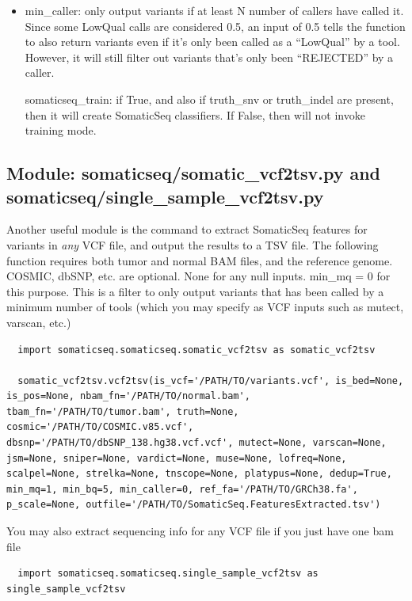 \documentclass[10pt,letterpaper]{article}
\begin{document}
\begin{sloppypar}
\begin{itemize}
\item min\_caller: only output variants if at least N number of callers have called it. Since some LowQual calls are considered 0.5, an input of 0.5 tells the function to also return variants even if it's only been called as a ``LowQual'' by a tool. However, it will still filter out variants that's only been ``REJECTED'' by a caller.

somaticseq\_train: if True, and also if truth\_snv or truth\_indel are present, then it will create SomaticSeq classifiers. If False, then will not invoke training mode. 

\end{itemize}





\subsection{Module: somaticseq/somatic\_vcf2tsv.py and somaticseq/single\_sample\_vcf2tsv.py} \label{module:vcf2tsv}

Another useful module is the command to extract SomaticSeq features for variants in \emph{any} VCF file, and output the results to a TSV file. The following function requires both tumor and normal BAM files, and the reference genome. COSMIC, dbSNP, etc. are optional. None for any null inputs. min\_mq = 0 for this purpose. This is a filter to only output variants that has been called by a minimum number of tools (which you may specify as VCF inputs such as mutect, varscan, etc.)

\begin{lstlisting}
  import somaticseq.somaticseq.somatic_vcf2tsv as somatic_vcf2tsv
  
  somatic_vcf2tsv.vcf2tsv(is_vcf='/PATH/TO/variants.vcf', is_bed=None, is_pos=None, nbam_fn='/PATH/TO/normal.bam', tbam_fn='/PATH/TO/tumor.bam', truth=None, cosmic='/PATH/TO/COSMIC.v85.vcf', dbsnp='/PATH/TO/dbSNP_138.hg38.vcf.vcf', mutect=None, varscan=None, jsm=None, sniper=None, vardict=None, muse=None, lofreq=None, scalpel=None, strelka=None, tnscope=None, platypus=None, dedup=True, min_mq=1, min_bq=5, min_caller=0, ref_fa='/PATH/TO/GRCh38.fa', p_scale=None, outfile='/PATH/TO/SomaticSeq.FeaturesExtracted.tsv')
\end{lstlisting}

You may also extract sequencing info for any VCF file if you just have one bam file

\begin{lstlisting}
  import somaticseq.somaticseq.single_sample_vcf2tsv as single_sample_vcf2tsv
  

\end{lstlisting}
\end{sloppypar}
\end{document}
